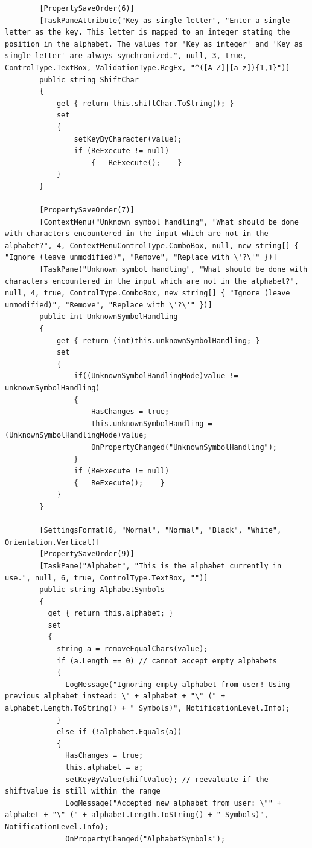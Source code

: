 \begin{lstlisting}
        [PropertySaveOrder(6)]
        [TaskPaneAttribute("Key as single letter", "Enter a single letter as the key. This letter is mapped to an integer stating the position in the alphabet. The values for 'Key as integer' and 'Key as single letter' are always synchronized.", null, 3, true, ControlType.TextBox, ValidationType.RegEx, "^([A-Z]|[a-z]){1,1}")]
        public string ShiftChar
        {
            get { return this.shiftChar.ToString(); }
            set
            {
                setKeyByCharacter(value);
                if (ReExecute != null)
	                {   ReExecute();    }
            }
        }

        [PropertySaveOrder(7)]
        [ContextMenu("Unknown symbol handling", "What should be done with characters encountered in the input which are not in the alphabet?", 4, ContextMenuControlType.ComboBox, null, new string[] { "Ignore (leave unmodified)", "Remove", "Replace with \'?\'" })]
        [TaskPane("Unknown symbol handling", "What should be done with characters encountered in the input which are not in the alphabet?", null, 4, true, ControlType.ComboBox, new string[] { "Ignore (leave unmodified)", "Remove", "Replace with \'?\'" })]
        public int UnknownSymbolHandling
        {
            get { return (int)this.unknownSymbolHandling; }
            set
            {
                if((UnknownSymbolHandlingMode)value != unknownSymbolHandling)
                {
                	HasChanges = true;
	                this.unknownSymbolHandling = (UnknownSymbolHandlingMode)value;
    	            OnPropertyChanged("UnknownSymbolHandling");
				}
                if (ReExecute != null) 
                {	ReExecute();	}
            }
        }

        [SettingsFormat(0, "Normal", "Normal", "Black", "White", Orientation.Vertical)]
        [PropertySaveOrder(9)]
        [TaskPane("Alphabet", "This is the alphabet currently in use.", null, 6, true, ControlType.TextBox, "")]
        public string AlphabetSymbols
        {
          get { return this.alphabet; }
          set
          {
            string a = removeEqualChars(value);
            if (a.Length == 0) // cannot accept empty alphabets
            {
              LogMessage("Ignoring empty alphabet from user! Using previous alphabet instead: \" + alphabet + "\" (" + alphabet.Length.ToString() + " Symbols)", NotificationLevel.Info);
            }
            else if (!alphabet.Equals(a))
            {
              HasChanges = true;
              this.alphabet = a;
              setKeyByValue(shiftValue); // reevaluate if the shiftvalue is still within the range
              LogMessage("Accepted new alphabet from user: \"" + alphabet + "\" (" + alphabet.Length.ToString() + " Symbols)", NotificationLevel.Info);
              OnPropertyChanged("AlphabetSymbols");


\end{lstlisting}
